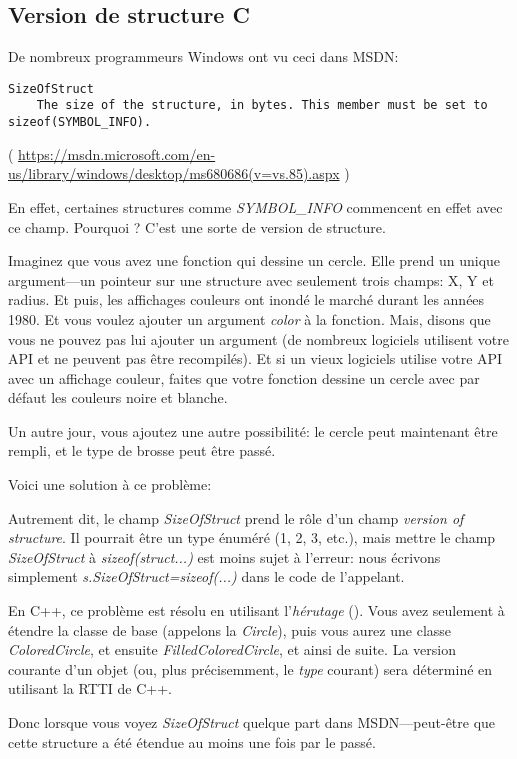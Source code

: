 \subsection{Version de structure C}

De nombreux programmeurs Windows ont vu ceci dans MSDN:

\begin{lstlisting}
SizeOfStruct
    The size of the structure, in bytes. This member must be set to sizeof(SYMBOL_INFO).
\end{lstlisting}

( \url{https://msdn.microsoft.com/en-us/library/windows/desktop/ms680686(v=vs.85).aspx} )

En effet, certaines structures comme \emph{SYMBOL\_INFO} commencent en effet avec ce
champ.  Pourquoi ?
C'est une sorte de version de structure.

Imaginez que vous avez une fonction qui dessine un cercle.
Elle prend un unique argument---un pointeur sur une structure avec seulement trois
champs: X, Y et radius.
Et puis, les affichages couleurs ont inondé le marché durant les années 1980. Et
vous voulez ajouter un argument \emph{color} à la fonction.
Mais, disons que vous ne pouvez pas lui ajouter un argument (de nombreux logiciels
utilisent votre \ac{API} et ne peuvent pas être recompilés).
Et si un vieux logiciels utilise votre \ac{API} avec un affichage couleur, faites
que votre fonction dessine un cercle avec par défaut les couleurs noire et blanche.

Un autre jour, vous ajoutez une autre possibilité: le cercle peut maintenant être
rempli, et le type de brosse peut être passé.

Voici une solution à ce problème:



Autrement dit, le champ \emph{SizeOfStruct} prend le rôle d'un champ \emph{version of structure}.
Il pourrait être un type énuméré (1, 2, 3, etc.), mais mettre le champ \emph{SizeOfStruct}
à \emph{sizeof(struct...)} est moins sujet à l'erreur: nous écrivons simplement \emph{s.SizeOfStruct=sizeof(...)}
dans le code de l'appelant.

En C++, ce problème est résolu en utilisant l'\emph{hérutage} ().
Vous avez seulement à étendre la classe de base (appelons la \emph{Circle}), puis vous
aurez une classe \emph{ColoredCircle}, et ensuite \emph{FilledColoredCircle}, et ainsi
de suite.
La version courante d'un objet (ou, plus précisemment, le \emph{type} courant) sera
déterminé en utilisant la \ac{RTTI} de C++.

Donc lorsque vous voyez \emph{SizeOfStruct} quelque part dans \ac{MSDN}---peut-être
que cette structure a été étendue au moins une fois par le passé.

